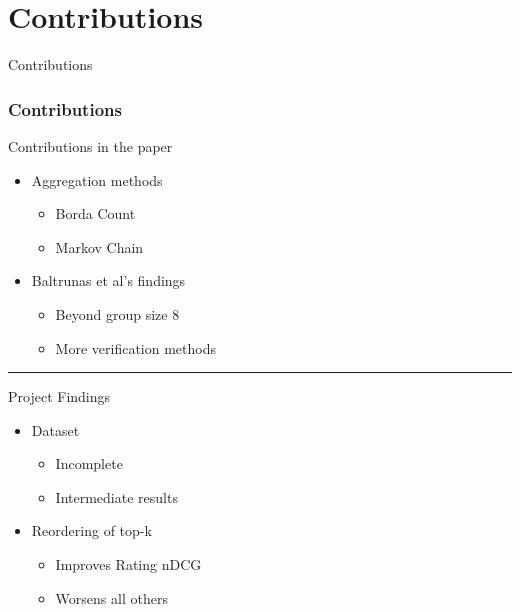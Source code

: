 \section{Contributions}
\begin{frame}
     \begin{center}
     	\huge Contributions
     \end{center}
\end{frame}

\begin{frame}
\frametitle{Contributions}
Contributions in the paper
\begin{itemize}
	\item Aggregation methods
	\begin{itemize}
		\item Borda Count
		\item Markov Chain
	\end{itemize}
	\item Baltrunas et al's findings
	\begin{itemize}
		\item Beyond group size 8
		\item More verification methods
	\end{itemize}
\end{itemize}
\hrule \smallskip
Project Findings
\begin{itemize}
	\item Dataset
	\begin{itemize}
		\item Incomplete
		\item Intermediate results
	\end{itemize}
	\item Reordering of top-k
	\begin{itemize}
		\item Improves Rating nDCG
		\item Worsens all others
	\end{itemize}
\end{itemize}
\end{frame}